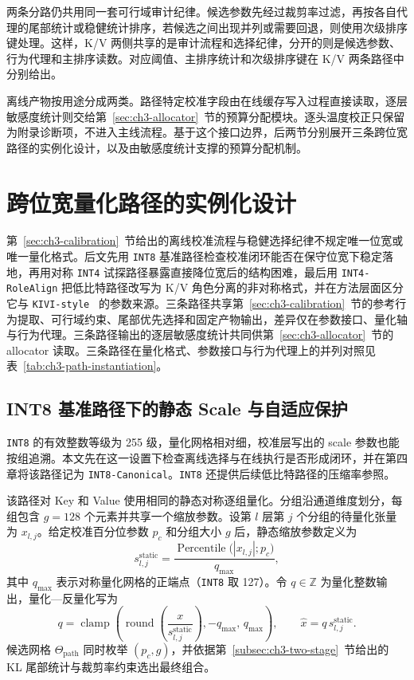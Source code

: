 两条分路仍共用同一套可行域审计纪律。候选参数先经过裁剪率过滤，再按各自代理的尾部统计或稳健统计排序，若候选之间出现并列或需要回退，则使用次级排序键处理。这样，K/V 两侧共享的是审计流程和选择纪律，分开的则是候选参数、行为代理和主排序读数。对应阈值、主排序统计和次级排序键在 K/V 两条路径中分别给出。

离线产物按用途分成两类。路径特定校准字段由在线缓存写入过程直接读取，逐层敏感度统计则交给第~\ref{sec:ch3-allocator}~节的预算分配模块。逐头温度校正只保留为附录诊断项，不进入主线流程。基于这个接口边界，后两节分别展开三条跨位宽路径的实例化设计，以及由敏感度统计支撑的预算分配机制。
\section{跨位宽量化路径的实例化设计}
\label{sec:ch3-paths}

第~\ref{sec:ch3-calibration}~节给出的离线校准流程与稳健选择纪律不规定唯一位宽或唯一量化格式。后文先用 \texttt{INT8} 基准路径检查校准闭环能否在保守位宽下稳定落地，再用对称 \texttt{INT4} 试探路径暴露直接降位宽后的结构困难，最后用 \texttt{INT4-RoleAlign} 把低比特路径改写为 K/V 角色分离的非对称格式，并在方法层面区分它与 \texttt{KIVI-style}~\cite{liu2024kivi} 的参数来源。三条路径共享第~\ref{sec:ch3-calibration}~节的参考行为提取、可行域约束、尾部优先选择和固定产物输出，差异仅在参数接口、量化轴与行为代理。三条路径输出的逐层敏感度统计共同供第~\ref{sec:ch3-allocator}~节的 allocator 读取。三条路径在量化格式、参数接口与行为代理上的并列对照见表~\ref{tab:ch3-path-instantiation}。



\subsection{INT8 基准路径下的静态 Scale 与自适应保护}
\label{subsec:ch3-int8-baseline}

\texttt{INT8} 的有效整数等级为 255 级，量化网格相对细，校准层写出的 scale 参数也能按组追溯。本文先在这一设置下检查离线选择与在线执行是否形成闭环，并在第四章将该路径记为 \texttt{INT8-Canonical}。\texttt{INT8} 还提供后续低比特路径的压缩率参照。

该路径对 Key 和 Value 使用相同的静态对称逐组量化。分组沿通道维度划分，每组包含 $g=128$ 个元素并共享一个缩放参数。设第 $l$ 层第 $j$ 个分组的待量化张量为 $x_{l,j}$。给定校准百分位参数 $p_c$ 和分组大小 $g$ 后，静态缩放参数定义为
\begin{equation}
s_{l,j}^{\mathrm{static}}
=
\frac{\operatorname{Percentile}\!\big(|x_{l,j}|; p_c\big)}
{q_{\max}},
\end{equation}
其中 $q_{\max}$ 表示对称量化网格的正端点（\texttt{INT8} 取 127）。令 $q\in\mathbb{Z}$ 为量化整数输出，量化—反量化写为
\begin{equation}
q
=
\operatorname{clamp}\!\left(
\operatorname{round}\!\left(\frac{x}{s_{l,j}^{\mathrm{static}}}\right),
-q_{\max},\, q_{\max}
\right),
\qquad
\hat x = q\, s_{l,j}^{\mathrm{static}}.
\end{equation}
候选网格 $\Theta_\mathrm{path}$ 同时枚举 $(p_c,g)$，并依据第~\ref{subsec:ch3-two-stage}~节给出的 KL 尾部统计与裁剪率约束选出最终组合。

